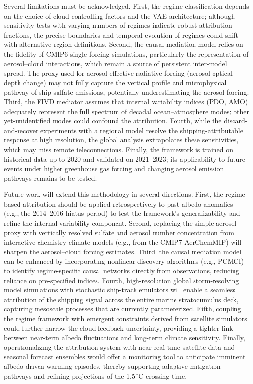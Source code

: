 \documentclass{article}
\begin{document}
Several limitations must be acknowledged. First, the regime classification depends on the choice of cloud-controlling factors and the VAE architecture; although sensitivity tests with varying numbers of regimes indicate robust attribution fractions, the precise boundaries and temporal evolution of regimes could shift with alternative region definitions. Second, the causal mediation model relies on the fidelity of CMIP6 single-forcing simulations, particularly the representation of aerosol–cloud interactions, which remain a source of persistent inter-model spread. The proxy used for aerosol effective radiative forcing (aerosol optical depth change) may not fully capture the vertical profile and microphysical pathway of ship sulfate emissions, potentially underestimating the aerosol forcing. Third, the FIVD mediator assumes that internal variability indices (PDO, AMO) adequately represent the full spectrum of decadal ocean–atmosphere modes; other yet-unidentified modes could confound the attribution. Fourth, while the discard-and-recover experiments with a regional model resolve the shipping-attributable response at high resolution, the global analysis extrapolates these sensitivities, which may miss remote teleconnections. Finally, the framework is trained on historical data up to 2020 and validated on 2021–2023; its applicability to future events under higher greenhouse gas forcing and changing aerosol emission pathways remains to be tested.

Future work will extend this methodology in several directions. First, the regime-based attribution should be applied retrospectively to past albedo anomalies (e.g., the 2014–2016 hiatus period) to test the framework’s generalizability and refine the internal variability component. Second, replacing the simple aerosol proxy with vertically resolved sulfate and aerosol number concentration from interactive chemistry-climate models (e.g., from the CMIP7 AerChemMIP) will sharpen the aerosol–cloud forcing estimates. Third, the causal mediation model can be enhanced by incorporating nonlinear discovery algorithms (e.g., PCMCI) to identify regime-specific causal networks directly from observations, reducing reliance on pre-specified indices. Fourth, high-resolution global storm-resolving model simulations with stochastic ship-track emulators will enable a seamless attribution of the shipping signal across the entire marine stratocumulus deck, capturing mesoscale processes that are currently parameterized. Fifth, coupling the regime framework with emergent constraints derived from satellite simulators could further narrow the cloud feedback uncertainty, providing a tighter link between near-term albedo fluctuations and long-term climate sensitivity. Finally, operationalizing the attribution system with near-real-time satellite data and seasonal forecast ensembles would offer a monitoring tool to anticipate imminent albedo-driven warming episodes, thereby supporting adaptive mitigation pathways and refining projections of the 1.5$\,^\circ$C crossing time.



\end{document}
